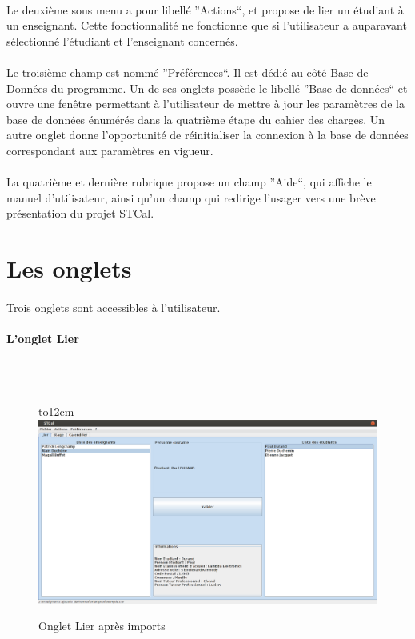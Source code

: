 \documentclass[a4paper,10pt]{report}
\begin{document}
	  \paragraph{}
	    Le deuxième sous menu a pour libellé ''Actions``, et propose de lier un étudiant à un enseignant. 
	    Cette fonctionnalité ne fonctionne que si l'utilisateur a auparavant sélectionné l'étudiant et l'enseignant concernés.
	  \paragraph{}
	    Le troisième champ est nommé ''Préférences``.
	    Il est dédié au côté Base de Données du programme.
	    Un de ses onglets possède le libellé ''Base de données`` et ouvre une fenêtre permettant à l'utilisateur de mettre à jour les paramètres de la base de données énumérés dans la quatrième étape du cahier des charges. 
	    Un autre onglet donne l'opportunité de réinitialiser la connexion à la base de données correspondant aux paramètres en vigueur.
	  \paragraph{}
	    La quatrième et dernière rubrique propose un champ ''Aide``, qui affiche le manuel d'utilisateur, ainsi qu'un champ qui redirige l'usager vers une brève présentation du projet STCal. 
      
        \section{Les onglets}
	  
	  \paragraph{}
	    Trois onglets sont accessibles à l'utilisateur.
	  
	  \paragraph{L'onglet Lier}
	  ~\\~\\
	  
	    \begin{figure}[!h]
	  
	    \hbox to12cm{\hss\includegraphics[width=18cm]{Lier.png}\hss}
	    \caption{Onglet Lier après imports}
	    \end{figure}
\end{document}
